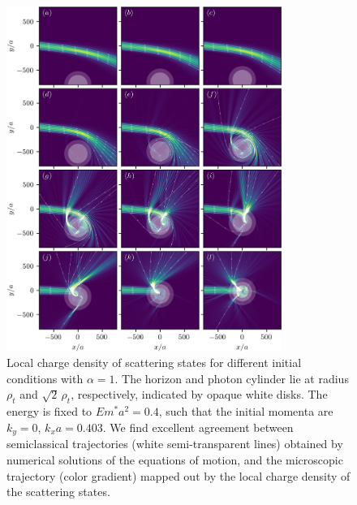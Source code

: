 \documentclass[submission, Phys]{SciPost}
\begin{document}
\begin{figure}[h!]
    \centering
    \includegraphics[width=0.8\textwidth]{fig/trajectories_alpha_1.0.jpg}
    \caption{Local charge density of scattering states for different initial conditions with $\alpha=1$. The horizon and photon cylinder lie at radius $\rho_t$ and $\sqrt2\,\rho_t$, respectively, indicated by opaque white disks. The energy is fixed to $Em^*a^2=0.4$, such that the initial momenta are $k_y=0$, 
    $k_xa=0.403$. We find excellent agreement between semiclassical trajectories (white semi-transparent lines) obtained by numerical solutions of the equations of motion, and the microscopic trajectory (color gradient) mapped out by the local charge density of the scattering states.}
    \label{fig:microscopic_semiclassics_alpha_1}
\end{figure}
\end{document}
